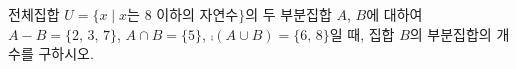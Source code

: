 전체집합 $U=\{x \mid x$는 $8$ 이하의 자연수$\}$의 두 부분집합 $A$, $B$에 대하여 $A-B=\{2,\,3,\,7\}$, $A\cap B=\{5\}$, $\comp{(A\cup B)}=\{6,\,8\}$일 때, 집합 $B$의 부분집합의 개수를 구하시오.
